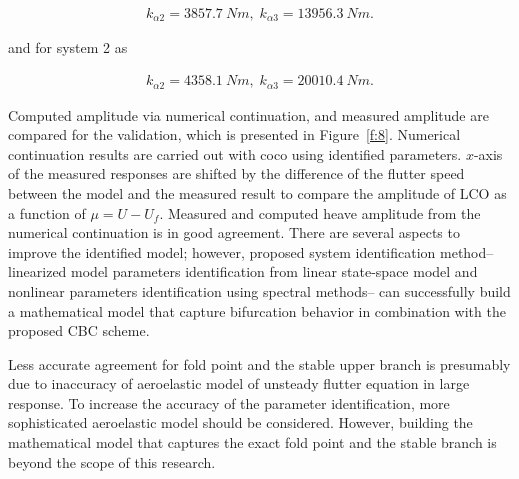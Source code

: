 \documentclass[openacc]{rsproca_new}%
\newcommand{\Fref}[1]{Figure~\ref{#1}}
\begin{document}
\begin{align}\label{eq:2-15}
k_{\alpha2}=3857.7 \: Nm, \; k_{\alpha3}=13956.3 \: Nm.
\end{align}

\noindent and for system 2 as

\begin{align}\label{eq:2-15-2}
k_{\alpha2}=4358.1 \: Nm, \; k_{\alpha3}=20010.4 \: Nm.
\end{align}

Computed amplitude via numerical continuation, and measured amplitude are compared for the validation, which is presented in \Fref{f:8}. Numerical continuation results are carried out with coco \cite{dankowicz2013recipes} using identified parameters. $x$-axis of the measured responses are shifted by the difference of the flutter speed between the model and the measured result to compare the amplitude of LCO as a function of $\mu=U-U_f$. Measured and computed heave amplitude from the numerical continuation is in good agreement. There are several aspects to improve the identified model; however, proposed system identification method-- linearized model parameters identification from linear state-space model and nonlinear parameters identification using spectral methods-- can successfully build a mathematical model that capture bifurcation behavior in combination with the proposed CBC scheme.

Less accurate agreement for fold point and the stable upper branch is presumably due to inaccuracy of aeroelastic model of unsteady flutter equation in large response. To increase the accuracy of the parameter identification, more sophisticated aeroelastic model should be considered. However, building the mathematical model that captures the exact fold point and the stable branch is beyond the scope of this research.
\end{document}
